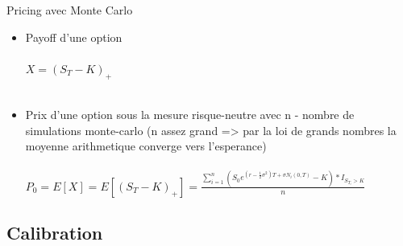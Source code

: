 \documentclass[10pt]{beamer}
\begin{document}
\begin{frame}{Pricing avec Monte Carlo}{}
  
 \begin{itemize}
    \item Payoff d'une option\\~\\
    $X = (S_T - K)_+$ \\~\\
    \item Prix d'une option sous la mesure risque-neutre avec n - nombre de simulations monte-carlo (n assez grand => par la loi de grands nombres la moyenne arithmetique converge vers l'esperance)\\~\\
    $ P_0 = E[X] = E[(S_T - K)_+] = 
    \frac{\sum\limits_{i=1}^n (S_0 e^{(r - \frac{1}{2}\sigma ^{2})T + \sigma N_i(0,T)} - K)*I_{S_{T_i}>K}}{n} $
    
  \end{itemize}

\end{frame}


\subsection{Calibration}
\end{document}
